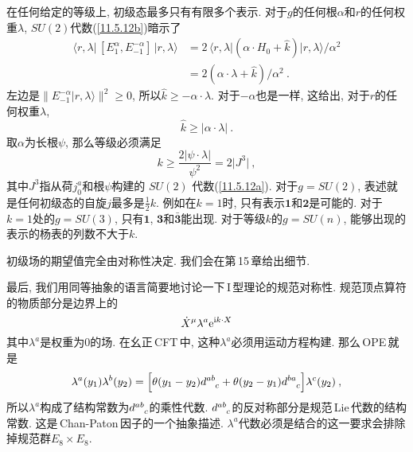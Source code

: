 在任何给定的等级上, 初级态最多只有有限多个表示. 对于$ g $的任何根$ \alpha $和$ r $的任何权重$ \lambda$, $ SU(2) $代数(\ref{11.5.12b})暗示了
\begin{align}
    \langle r,\lambda \rvert\, [E_{1}^{\alpha},E_{-1}^{-\alpha}]\,\lvert r,\lambda\rangle 
    &= 2\,\langle r,\lambda \rvert (\alpha \cdot H_{0}+\hat{k})\rvert r,\lambda \rangle/\alpha^{2} \nonumber \\
    &=2(\alpha \cdot \lambda + \hat{k})/\alpha^{2} \:. \label{11.5.42}
\end{align}
左边是$ \lVert E_{-1}^{-\alpha}\lvert r,\lambda\rangle \rVert^{2}\geq 0$, 所以$ \hat{k}\geq -\alpha\cdot \lambda$. 对于$ -\alpha $也是一样, 这给出, 对于$ r $的任何权重$ \lambda$,
\begin{equation}
    \hat{k} \geq \lvert \alpha \cdot \lambda \rvert \:. \label{11.5.43}
\end{equation}
取$ \alpha $为长根$ \psi$, 那么等级必须满足
\begin{equation}
    k \geq \frac{2\lvert \psi \cdot \lambda \rvert}{\psi^{2}} = 2\lvert J^{3}\rvert \:, \label{11.5.44}
\end{equation}
其中$ J^{3} $指从荷$ j_{0}^{a} $和根$ \psi $构建的 $SU(2)$ 代数(\ref{11.5.12a}). 对于$ g=SU(2)$, 表述就是任何初级态的自旋$ j $最多是$ \tfrac{1}{2}k$. 例如在$ k=1 $时, 只有表示$ \mathbf{1} $和$ \mathbf{2} $是可能的. 对于$ k=1 $处的$ g=SU(3)$, 只有$ \mathbf{1}$, $\mathbf{3} $和$ \bar{\mathbf{3}} $能出现. 对于等级$ k $的$ g=SU(n)$, 能够出现的表示的杨表的列数不大于$ k$.

初级场的期望值完全由对称性决定. 我们会在第\,15\,章给出细节.

最后, 我们用同等抽象的语言简要地讨论一下\,I\,型理论的规范对称性. 规范顶点算符的物质部分是边界上的
\begin{equation}
    \dot{X}^{\mu}\lambda^{a}\mathrm{e}^{\mathrm{i} k\cdot X} \label{11.5.45}
\end{equation}
其中$ \lambda^{a} $是权重为$ 0 $的场. 在幺正\,CFT\,中, 这种$ \lambda^{a} $必须用运动方程构建. 那么\,OPE\,就是
\begin{equation}
    \lambda^{a}(y_{1})\lambda^{b}(y_{2}) = \Bigl[\theta(y_{1}-y_{2})d\indices{^a^b_c}+
    \theta(y_{2}-y_{1})d\indices{^b^a_c}\Bigr] \lambda^{c}(y_{2}) \:, \label{11.5.46}
\end{equation}
所以$ \lambda^{a} $构成了结构常数为$ d\indices{^a^b_c} $的乘性代数. $d\indices{^a^b_c} $的反对称部分是规范\,Lie\,代数的结构常数. 这是\,Chan-Paton\,因子的一个抽象描述. $\lambda^{a} $代数必须是结合的这一要求会排除掉规范群$ E_{8}\times E_{8}$.


